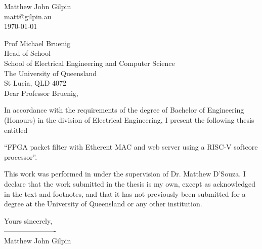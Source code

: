 \fancyhf{}

\begin{flushright}
	Matthew John Gilpin\\
	matt@gilpin.au\\
	\medskip
	\today
\end{flushright}

\begin{flushleft}
  Prof Michael Bruenig\\
  Head of School\\
  School of Electrical Engineering and Computer Science\\
  The University of Queensland\\
  St Lucia, QLD 4072\\
  \bigskip\bigskip
  Dear Professor Bruenig,
\end{flushleft}

\noindent
In accordance with the requirements of the degree of Bachelor of
Engineering (Honours) in the division of Electrical Engineering,
I present the following thesis entitled 

\vspace{1em}
{\centering “FPGA packet filter with Etherent MAC and web server using a RISC-V softcore processor”.\par}
\vspace{1em}

\noindent This work was performed in under the supervision of
Dr. Matthew D'Souza. I declare that the work submitted in the thesis is my own, 
except as acknowledged in the text and footnotes, and that it has
not previously been submitted for a degree at the University of 
Queensland or any other institution.\bigskip \bigskip

\begin{flushright}
    
	Yours sincerely,\\
	\bigskip
	----------------------\\
	\medskip
	Matthew John Gilpin
\end{flushright}
\clearpage